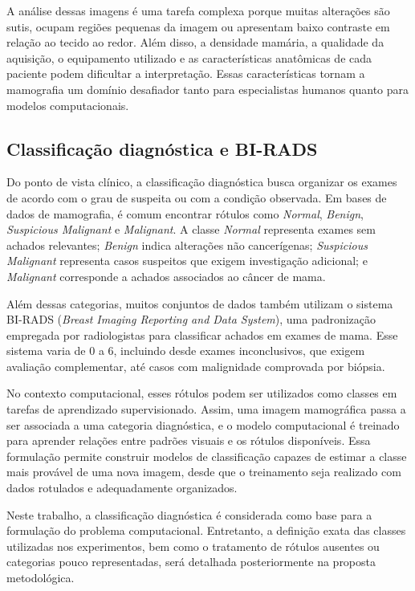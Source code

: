 \documentclass[
    12pt,
    openright,
    oneside,
    a4paper,
    english,
    brazil
]{abntex2}
\begin{document}
A análise dessas imagens é uma tarefa complexa porque muitas alterações são sutis, ocupam regiões pequenas da imagem ou apresentam baixo contraste em relação ao tecido ao redor. Além disso, a densidade mamária, a qualidade da aquisição, o equipamento utilizado e as características anatômicas de cada paciente podem dificultar a interpretação. Essas características tornam a mamografia um domínio desafiador tanto para especialistas humanos quanto para modelos computacionais.

\subsection{Classificação diagnóstica e BI-RADS}

Do ponto de vista clínico, a classificação diagnóstica busca organizar os exames de acordo com o grau de suspeita ou com a condição observada. Em bases de dados de mamografia, é comum encontrar rótulos como \textit{Normal}, \textit{Benign}, \textit{Suspicious Malignant} e \textit{Malignant}. A classe \textit{Normal} representa exames sem achados relevantes; \textit{Benign} indica alterações não cancerígenas; \textit{Suspicious Malignant} representa casos suspeitos que exigem investigação adicional; e \textit{Malignant} corresponde a achados associados ao câncer de mama.

Além dessas categorias, muitos conjuntos de dados também utilizam o sistema BI-RADS (\textit{Breast Imaging Reporting and Data System}), uma padronização empregada por radiologistas para classificar achados em exames de mama. Esse sistema varia de 0 a 6, incluindo desde exames inconclusivos, que exigem avaliação complementar, até casos com malignidade comprovada por biópsia.

No contexto computacional, esses rótulos podem ser utilizados como classes em tarefas de aprendizado supervisionado. Assim, uma imagem mamográfica passa a ser associada a uma categoria diagnóstica, e o modelo computacional é treinado para aprender relações entre padrões visuais e os rótulos disponíveis. Essa formulação permite construir modelos de classificação capazes de estimar a classe mais provável de uma nova imagem, desde que o treinamento seja realizado com dados rotulados e adequadamente organizados.

Neste trabalho, a classificação diagnóstica é considerada como base para a formulação do problema computacional. Entretanto, a definição exata das classes utilizadas nos experimentos, bem como o tratamento de rótulos ausentes ou categorias pouco representadas, será detalhada posteriormente na proposta metodológica.
\end{document}
